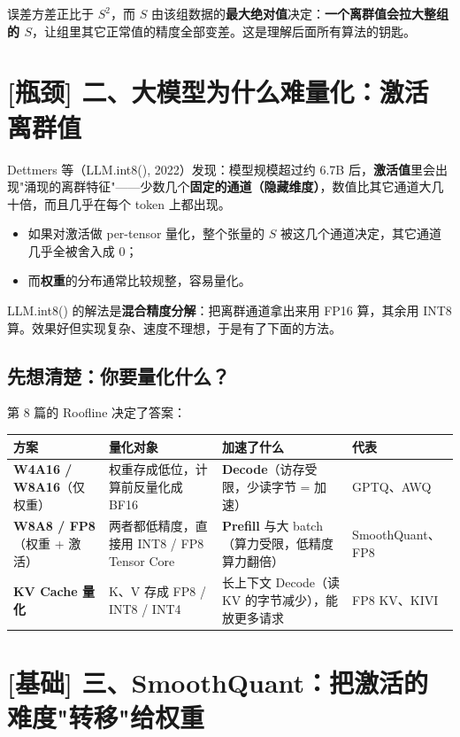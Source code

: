 误差方差正比于 $S^2$，而 $S$ 由该组数据的\textbf{最大绝对值}决定：\textbf{一个离群值会拉大整组的 $S$}，让组里其它正常值的精度全部变差。这是理解后面所有算法的钥匙。

\section{[瓶颈] 二、大模型为什么难量化：激活离群值}

Dettmers 等（LLM.int8(), 2022）发现：模型规模超过约 6.7B 后，\textbf{激活值}里会出现"涌现的离群特征"——少数几个\textbf{固定的通道（隐藏维度）}，数值比其它通道大几十倍，而且几乎在每个 token 上都出现。
\begin{itemize}
  \item 如果对激活做 per-tensor 量化，整个张量的 $S$ 被这几个通道决定，其它通道几乎全被舍入成 0；
  \item 而\textbf{权重}的分布通常比较规整，容易量化。
\end{itemize}

LLM.int8() 的解法是\textbf{混合精度分解}：把离群通道拿出来用 FP16 算，其余用 INT8 算。效果好但实现复杂、速度不理想，于是有了下面的方法。

\subsection{先想清楚：你要量化什么？}

第 8 篇的 Roofline 决定了答案：

\begin{center}
\small
\begin{tabularx}{\textwidth}{p{2.5cm} p{3.5cm} X X}
\toprule
\textbf{方案} & \textbf{量化对象} & \textbf{加速了什么} & \textbf{代表} \\
\midrule
\textbf{W4A16 / W8A16}（仅权重） & 权重存成低位，计算前反量化成 BF16 & \textbf{Decode}（访存受限，少读字节 = 加速） & GPTQ、AWQ \\
\textbf{W8A8 / FP8}（权重 + 激活） & 两者都低精度，直接用 INT8 / FP8 Tensor Core & \textbf{Prefill} 与大 batch（算力受限，低精度算力翻倍） & SmoothQuant、FP8 \\
\textbf{KV Cache 量化} & K、V 存成 FP8 / INT8 / INT4 & 长上下文 Decode（读 KV 的字节减少），能放更多请求 & FP8 KV、KIVI \\
\bottomrule
\end{tabularx}
\end{center}

\section{[基础] 三、SmoothQuant：把激活的难度"转移"给权重}

